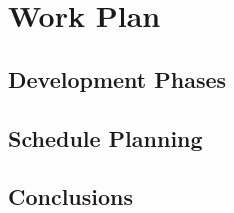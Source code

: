 \chapter{Work Plan} \label{chap:workplan}

\section*{}

\section{Development Phases}\label{sec:devphases}

\section{Schedule Planning}\label{sec:schedule}

\section{Conclusions}
